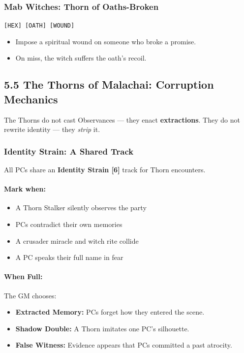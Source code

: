 \documentclass[11pt]{book}
\begin{document}
\subsubsection*{Mab Witches: Thorn of Oaths-Broken}
\texttt{[HEX] [OATH] [WOUND]}
\begin{itemize}
    \item Impose a spiritual wound on someone who broke a promise.
    \item On miss, the witch suffers the oath's recoil.
\end{itemize}

\subsection{5.5 The Thorns of Malachai: Corruption Mechanics}

The Thorns do not cast Observances --- they enact \textbf{extractions}.  
They do not rewrite identity --- they \emph{strip} it.

\subsubsection*{Identity Strain: A Shared Track}

All PCs share an \textbf{Identity Strain [6]} track for Thorn encounters.

\paragraph{Mark when:}
\begin{itemize}[leftmargin=*]
    \item A Thorn Stalker silently observes the party
    \item PCs contradict their own memories
    \item A crusader miracle and witch rite collide
    \item A PC speaks their full name in fear
\end{itemize}

\paragraph{When Full:}
The GM chooses:

\begin{itemize}[leftmargin=*]
    \item \textbf{Extracted Memory:} PCs forget how they entered the scene.
    \item \textbf{Shadow Double:} A Thorn imitates one PC's silhouette.
    \item \textbf{False Witness:} Evidence appears that PCs committed a past atrocity.
\end{itemize}
\end{document}
